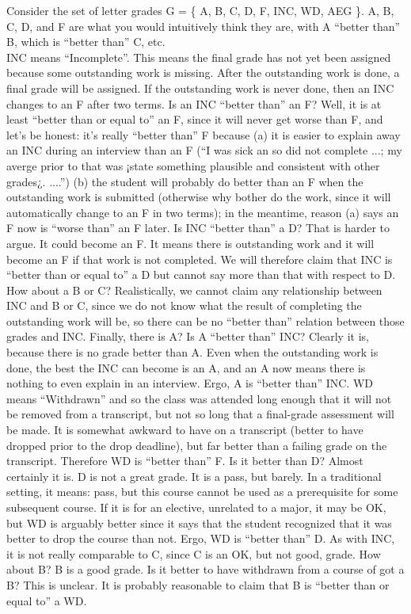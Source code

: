 \documentclass[12pt]{article}
\newenvironment{problem}[2][Problem]{\begin{trivlist}
\item[\hskip \labelsep {\bfseries #1}\hskip \labelsep {\bfseries #2.}]}{\end{trivlist}}
\begin{document}
\begin{problem}{7}
Consider the set of letter grades G = \{ A, B, C, D, F, INC, WD, AEG \}. A, B, C, D, and F are what you would intuitively think they are, with A “better than” B, which is “better than” C, etc. \\ \vskip 0.05in
INC means “Incomplete”. This means the final grade has not yet been assigned because some outstanding work is missing. After the outstanding work is done, a final grade will be assigned. If the outstanding work is never done, then an INC changes to an F after two terms. Is an INC “better than” an F? Well, it is at least “better than or equal to” an F, since it will never get worse than F, and let’s be honest: it’s really “better than” F because (a) it is easier to explain away an INC during an interview than an F (“I was sick an so did not complete ...; my averge prior to that was ¡state something plausible and consistent with other grades¿. ....”) (b) the student will probably do better than an F when the outstanding work is submitted (otherwise why bother do the work, since it will automatically change to an F in two terms); in the meantime, reason (a) says an F now is “worse than” an F later. Is INC “better than” a D? That is harder to argue. It could become an F. It means there is outstanding work and it will become an F if that work is not completed. We will therefore claim that INC is “better than or equal to” a D but cannot say more than that with respect to D. How about a B or C? Realistically, we cannot claim any relationship between INC and B or C, since we do not know what the result of completing the outstanding work will be, so there can be no “better than” relation between those grades and INC. Finally, there is A? Is A “better than” INC? Clearly it is, because there is no grade better than A. Even when the outstanding work is done, the best the INC can become is an A, and an A now means there is nothing to even explain in an interview. Ergo, A is “better than” INC. \vskip 0.2in
WD means “Withdrawn” and so the class was attended long enough that it will not be removed from a transcript, but not so long that a final-grade assessment will be made. It is somewhat awkward to have on a transcript (better to have dropped prior to the drop deadline), but far better than a failing grade on the transcript. Therefore WD is “better than” F. Is it better than D? Almost certainly it is. D is not a great grade. It is a pass, but barely. In a traditional setting, it means: pass, but this course cannot be used as a prerequisite for some subsequent course. If it is for an elective, unrelated to a major, it may be OK, but WD is arguably better since it says that the student recognized that it was better to drop the course than not. Ergo, WD is “better than” D. As with INC, it is not really comparable to C, since C is an OK, but not good, grade. How about B? B is a good grade. Is it better to have withdrawn from a course of got a B? This is unclear. It is probably reasonable to claim that B is “better than or equal to” a WD. \vskip 0.2in

\end{problem}
\end{document}
